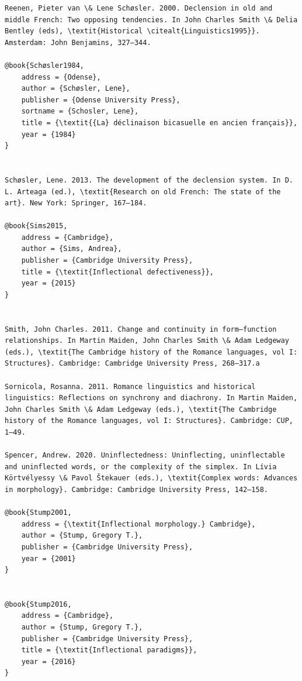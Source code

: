 \documentclass[output=paper]{langscibook}
\begin{document}
\begin{verbatim}
Reenen, Pieter van \& Lene Schøsler. 2000. Declension in old and middle French: Two opposing tendencies. In John Charles Smith \& Delia Bentley (eds), \textit{Historical \citealt{Linguistics1995}}. Amsterdam: John Benjamins, 327–344.

@book{Schøsler1984,
	address = {Odense},
	author = {Schøsler, Lene},
	publisher = {Odense University Press},
	sortname = {Schosler, Lene},
	title = {\textit{{La} déclinaison bicasuelle en ancien français}},
	year = {1984}
}


Schøsler, Lene. 2013. The development of the declension system. In D. L. Arteaga (ed.), \textit{Research on old French: The state of the art}. New York: Springer, 167–184.

@book{Sims2015,
	address = {Cambridge},
	author = {Sims, Andrea},
	publisher = {Cambridge University Press},
	title = {\textit{Inflectional defectiveness}},
	year = {2015}
}


Smith, John Charles. 2011. Change and continuity in form–function relationships. In Martin Maiden, John Charles Smith \& Adam Ledgeway (eds.), \textit{The Cambridge history of the Romance languages, vol I: Structures}. Cambridge: Cambridge University Press, 268–317.a

Sornicola, Rosanna. 2011. Romance linguistics and historical linguistics: Reflections on synchrony and diachrony. In Martin Maiden, John Charles Smith \& Adam Ledgeway (eds.), \textit{The Cambridge history of the Romance languages, vol I: Structures}. Cambridge: CUP, 1–49.

Spencer, Andrew. 2020. Uninflectedness: Uninflecting, uninflectable and uninflected words, or the complexity of the simplex. In Lívia Körtvélyessy \& Pavol Štekauer (eds.), \textit{Complex words: Advances in morphology}. Cambridge: Cambridge University Press, 142–158.

@book{Stump2001,
	address = {\textit{Inflectional morphology.} Cambridge},
	author = {Stump, Gregory T.},
	publisher = {Cambridge University Press},
	year = {2001}
}


@book{Stump2016,
	address = {Cambridge},
	author = {Stump, Gregory T.},
	publisher = {Cambridge University Press},
	title = {\textit{Inflectional paradigms}},
	year = {2016}
}


\end{verbatim}
\sloppy\printbibliography[heading=subbibliography,notkeyword=this]
\end{document}
